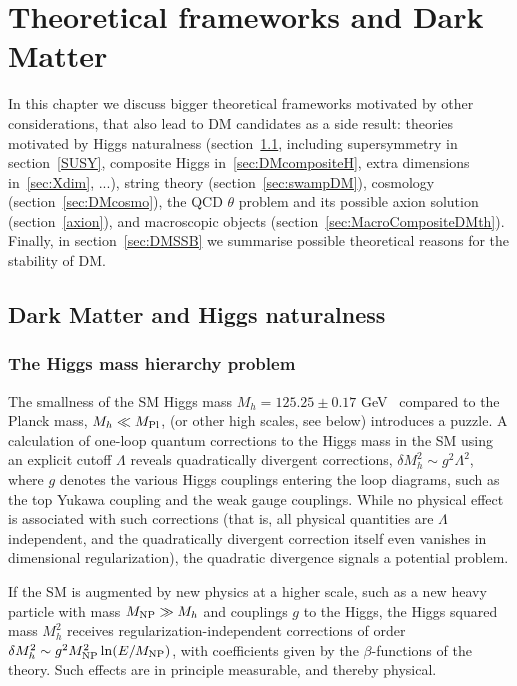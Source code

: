 \chapter{Theoretical frameworks and Dark Matter}
\label{BigDMtheories}
In this chapter we discuss bigger theoretical frameworks motivated by other considerations, 
that also lead to DM candidates as a side result:
theories motivated by Higgs naturalness (section~\ref{sec:Hnat}, including 
supersymmetry in section~\ref{SUSY},  composite Higgs in~\ref{sec:DMcompositeH}, extra dimensions in~\ref{sec:Xdim}, ...),
string theory (section~\ref{sec:swampDM}),
cosmology (section~\ref{sec:DMcosmo}),
the QCD $\theta$ problem and its possible axion solution (section~\ref{axion}), 
and  macroscopic objects (section~\ref{sec:MacroCompositeDMth}).
Finally, in section~\ref{sec:DMSSB} we summarise possible theoretical reasons for the stability of DM.



\section{Dark Matter and Higgs naturalness}\label{sec:Hnat}

\subsection{The Higgs mass hierarchy problem}\label{sec:hierarchyproblem}
The smallness of the SM Higgs mass $M_h=125.25 \pm 0.17$ GeV~\cite{PDG} compared to the Planck mass, $M_h\ll M_{\rm Pl}$, (or other high scales, see below) introduces a puzzle.
A calculation of one-loop quantum corrections to the Higgs mass in the SM using an explicit cutoff $\Lambda$ 
reveals quadratically divergent corrections,  $\delta M_h^2 \sim g^2 \Lambda^2$, 
where $g$ denotes the various Higgs couplings entering the loop diagrams,
such as the top Yukawa coupling and the weak gauge couplings.
While no physical effect is associated with such corrections 
(that is, all physical quantities are $\Lambda$ independent, 
and the quadratically divergent correction itself even vanishes in dimensional regularization), 
the quadratic divergence signals a potential problem. 

If the SM is augmented by new physics at a higher scale, 
such as a new heavy particle with mass 
$M_{\rm NP} \gg M_h$ and couplings $g$ to the Higgs, 
the Higgs squared mass  $M_{h}^2$ receives regularization-independent
corrections of order $\delta M_h^2 \sim g^2 M_{\rm NP}^2 \ln (E/M_{\rm NP})$,
with coefficients given by the $\beta$-functions of the theory.
Such effects are in principle measurable, and thereby physical.

